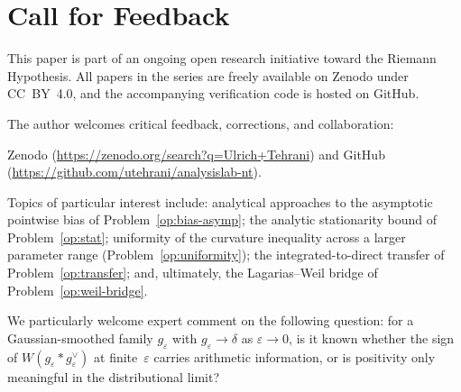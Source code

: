 \documentclass[11pt]{article}
\begin{document}
\section*{Call for Feedback}

This paper is part of an ongoing open research initiative toward the
Riemann Hypothesis.
All papers in the series are freely available on Zenodo under CC~BY~4.0,
and the accompanying verification code is hosted on GitHub.

The author welcomes critical feedback, corrections, and collaboration:
{\sloppy
Zenodo (\url{https://zenodo.org/search?q=Ulrich+Tehrani}) and GitHub
(\url{https://github.com/utehrani/analysislab-nt}).
\par}

Topics of particular interest include: analytical approaches to the
asymptotic pointwise bias of Problem~\ref{op:bias-asymp}; the analytic
stationarity bound of Problem~\ref{op:stat}; uniformity of the
curvature inequality across a larger parameter range
(Problem~\ref{op:uniformity}); the integrated-to-direct transfer of
Problem~\ref{op:transfer}; and, ultimately, the Lagarias--Weil bridge
of Problem~\ref{op:weil-bridge}.

We particularly welcome expert comment on the following question:
for a Gaussian-smoothed family $g_\varepsilon$ with
$g_\varepsilon\to\delta$ as $\varepsilon\to 0$, is it known whether
the sign of $W(g_\varepsilon * g_\varepsilon^\vee)$ at
finite~$\varepsilon$ carries arithmetic information, or is positivity
only meaningful in the distributional limit?
\end{document}
